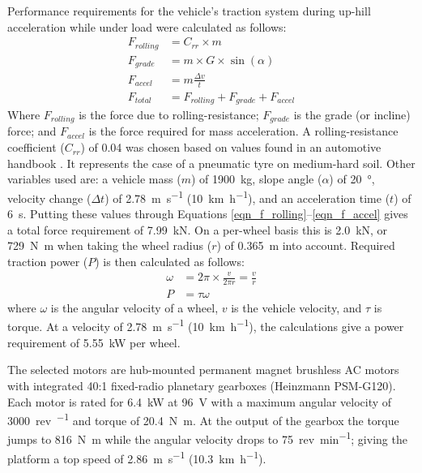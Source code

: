 \documentclass[preprint,authoryear,12pt]{elsarticle}
\begin{document}

        Performance requirements for the vehicle's traction system during up-hill acceleration while under load were calculated as follows:
        \begin{align}
        \label{eqn_f_rolling}
        F_{rolling} &= C_{rr} \times m\\
        F_{grade} &= m \times G \times \sin(\alpha)\\
        F_{accel} &= m \frac{\Delta v}{t}\\
        \label{eqn_f_accel}
        F_{total} &= F_{rolling} + F_{grade} + F_{accel}
        \end{align}
        Where $F_{rolling}$ is the force due to rolling-resistance; $F_{grade}$ is the grade (or incline) force; and $F_{accel}$ is the force required for mass acceleration.
        A rolling-resistance coefficient ($C_{rr}$) of 0.04 was chosen based on values found in an automotive handbook \citep{RobertBoschGmbH2002}.
        It represents the case of a pneumatic tyre on medium-hard soil.
        Other variables used are: a vehicle mass ($m$) of \SI{1900}{\kilo\gram}, slope angle ($\alpha$) of \SI{20}{\degree}, velocity change ($\Delta t$) of \SI{2.78}{\metre\per\second} (\SI{10}{\kilo\meter\per\hour}), and an acceleration time ($t$) of \SI{6}{\second}.
        Putting these values through Equations \ref{eqn_f_rolling}--\ref{eqn_f_accel} gives a total force requirement of \SI{7.99}{\kilo\newton}.
        On a per-wheel basis this is \SI{2.0}{\kilo\newton}, or \SI{729}{\newton\meter} when taking the wheel radius ($r$) of \SI{0.365}{\meter} into account.
        Required traction power ($P$) is then calculated as follows:
        \begin{align}
        \label{eqn_f_power}
        \omega &= 2 \pi \times \frac{v}{2 \pi r} = \frac{v}{r}\\
        P &= \tau \omega
        \end{align}
        where $\omega$ is the angular velocity of a wheel, $v$ is the vehicle velocity, and $\tau$ is torque.
        At a velocity of \SI{2.78}{\meter\per\second} (\SI{10}{\kilo\meter\per\hour}), the calculations give a power requirement of \SI{5.55}{\kilo\watt} per wheel.

        The selected motors are hub-mounted permanent magnet brushless AC motors with integrated 40:1 fixed-radio planetary gearboxes (Heinzmann PSM-G120).
        Each motor is rated for \SI{6.4}{\kilo\watt} at \SI{96}{\volt} with a maximum angular velocity of \SI{3000}{rev\per\min} and torque of \SI{20.4}{\newton\meter}.
        At the output of the gearbox the torque jumps to \SI{816}{\newton\meter} while the angular velocity drops to \SI{75}{rev\per\minute}; giving the platform a top speed of \SI{2.86}{\meter\per\second} (\SI{10.3}{\kilo\meter\per\hour}).
\end{document}

